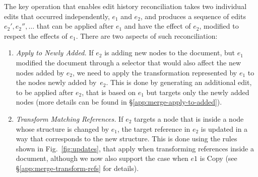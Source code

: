 \documentclass[sigconf]{acmart}
\newcommand{\note}[1]{}
\newcommand{\ident}[1]{{\sffamily #1}}
\begin{document}

The key operation that enables edit history reconciliation takes two individual edits that occurred
independently, $e_1$ and $e_2$, and produces a sequence of edits $e_2', e_2'', \ldots$ that
can be applied after $e_1$ and have the effect of $e_2$, modified to respect the effects of $e_1$.
There are two aspects of such reconciliation:

\begin{enumerate}
\item \emph{Apply to Newly Added.} If $e_2$ is adding new nodes to the document, but
  $e_1$ modified the document through a selector that would also affect the new nodes added by $e_2$,
  we need to apply the transformation represented by $e_1$ to the nodes newly added by~$e_2$.
  This is done by generating an additional edit, to be applied after $e_2$, that is based on
  $e_1$ but targets only the newly added nodes (more details can be found in \S\ref{app:merge-apply-to-added}).

\item \emph{Transform Matching References.} If $e_2$ targets a node that is inside a node
  whose structure is changed by $e_1$, the target reference in $e_2$ is updated in a way that
  corresponds to the new structure. This is done using the rules shown in Fig.~\ref{fig:updates},
  that apply when transforming references inside a document, although we now also support the case
  when $e1$ is \ident{Copy} (see \S\ref{app:merge-transform-refs} for details).
\end{enumerate}

%
\end{document}
